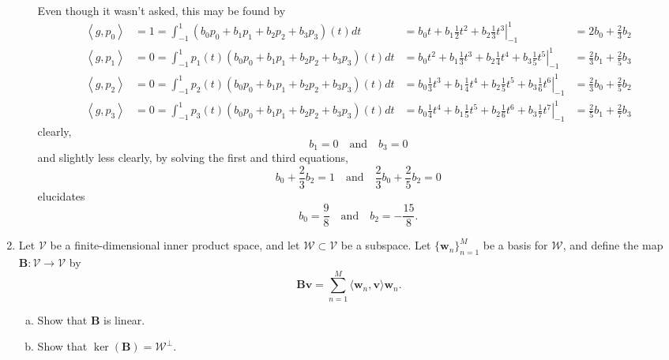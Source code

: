 \documentclass[12pt]{amsart}
\newcommand{\1}{\mathbbm{1}}
\numberwithin{equation}{section}
\numberwithin{Theorem}{section}
\theoremstyle{plain} %
\theoremstyle{definition}
\theoremstyle{remark}
\begin{document}
\begin{enumerate}[1.]
\begin{enumerate}[(a)]
Even though it wasn't asked, this may be found by
\begin{align*}
	\left\langle g, p_0\right\rangle &= 1 
	=\int_{-1}^1\left(b_0 p_0+b_1 p_1+b_2 p_2+b_3 p_3\right)(t) dt 
	&= b_0 t+b_1 \frac{1}{2} t^2+\left.b_2 \frac{1}{3} t^3\right|_{-1}^1
	&=2 b_0 + \frac{2}{3}b_2\\
	\left\langle g, p_1\right\rangle&= 0 
	=\int_{-1}^1 p_1(t)\left(b_0 p_0+b_1 p_1+b_2 p_2+b_3 p_3\right)(t) dt 
	&= b_0 t^2+b_1 \frac{1}{3} t^3+b_2 \frac{1}{4} t^4+\left.b_3 \frac{1}{5} t^5\right|_{-1} ^1
	&=\frac{2}{3} b_1+\frac{2}{5} b_3 \\
	\left\langle g, p_2\right\rangle&=0
	=\int_{-1}^1 p_2(t)\left(b_0 p_0+b_1 p_1+b_2 p_2+b_3 p_3\right)(t) dt 
	&=b_0 \frac{1}{3} t^3+b_1 \frac{1}{4} t^4+b_2 \frac{1}{5} t^5+\left.b_3 \frac{1}{6} t^6\right|_{-1} ^1
	&=\frac{2}{3} b_0+\frac{2}{5} b_2 \\
	\left\langle g, p_3\right\rangle&=0
	=\int_{-1}^1 p_3(t)\left(b_0 p_0+b_1 p_1+b_2 p_2+b_3 p_3\right)(t) dt 
	&=b_0 \frac{1}{4} t^4+b_1 \frac{1}{5} t^5+b_2 \frac{1}{6} t^6+\left.b_3 \frac{1}{7} t^7\right|_{-1} ^1
	&=\frac{2}{5} b_1+\frac{2}{7} b_3
\end{align*}
clearly,
\[b_1 = 0 \quad \text{and} \quad b_3 = 0\]
and slightly less clearly, by solving the first and third equations,
\[
b_0 + \frac{2}{3}b_2 = 1 \quad \text{and} \quad 
\frac{2}{3} b_0+\frac{2}{5} b_2 = 0
\]
elucidates
\[b_0 = \frac{9}{8} \quad \text{and} \quad b_2 = -\frac{15}{8}.\]

\end{enumerate}

\clearpage

\item Let \(\mathcal{V}\) be a finite-dimensional inner product space, and let \(\mathcal{W}\subset \mathcal{V}\) be a subspace. Let \(\{\mathbf{w}_{n}\}_{n=1}^{M}\) be a basis for \(\mathcal{W}\), and define the map \(\mathbf{B}:\mathcal{V}\to\mathcal{V}\) by
\[\mathbf{B}\mathbf{v} = \sum_{n=1}^{M}\langle \mathbf{w}_{n},\mathbf{v}\rangle \mathbf{w}_{n}.\]\medskip

\begin{enumerate}[(a)]

\item Show that \(\mathbf{B}\) is linear.\medskip

\item Show that \(\operatorname{ker}(\mathbf{B}) = \mathcal{W}^{\bot}\).\medskip


\end{enumerate}
\end{enumerate}
\end{document}
